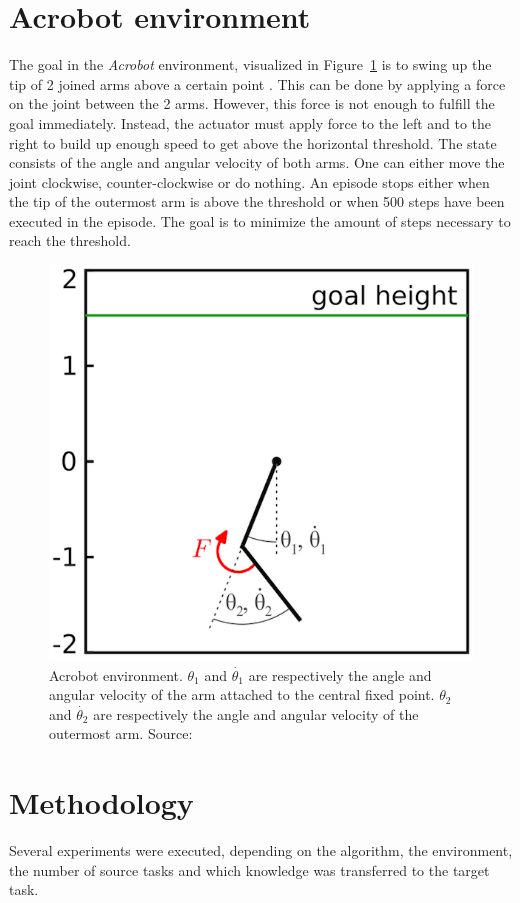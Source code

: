 \section{Acrobot environment} %
\label{sub:acrobot_environment}
The goal in the \textit{Acrobot} environment, visualized in Figure~\ref{fig:acrobot} is to swing up  the tip of 2 joined arms above a certain point \cite{spong1995swing}.
This can be done by applying a force on the joint between the 2 arms.
However, this force is not enough to fulfill the goal immediately. Instead, the actuator must apply force to the left and to the right to build up enough speed to get above the horizontal threshold.
The state consists of the angle and angular velocity of both arms. One can either move the joint clockwise, counter-clockwise or do nothing.
An episode stops either when the tip of the outermost arm is above the threshold or when 500 steps have been executed in the episode.
The goal is to minimize the amount of steps necessary to reach the threshold.
\begin{figure}[htb]
    \centering
    \includegraphics[width=.7\linewidth]{images/acrobot.png}
    \caption[Acrobot environment]{Acrobot environment. $\theta_1$ and $\dot{\theta_1}$ are respectively the angle and angular velocity of the arm attached to the central fixed point. $\theta_2$ and $\dot{\theta_2}$ are respectively the angle and angular velocity of the outermost arm. Source: \cite{fremaux2013reinforcement}}
    \label{fig:acrobot}
\end{figure}

\section{Methodology} %
\label{sub:methodology}
Several experiments were executed, depending on the algorithm, the environment, the number of source tasks and which knowledge was transferred to the target task.\\

